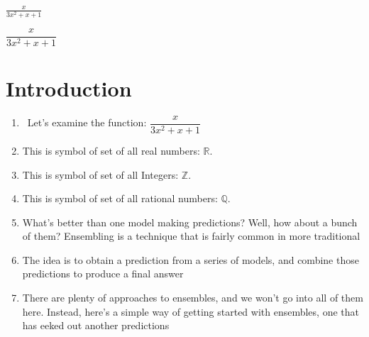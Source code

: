 \documentclass[11pt, a4paper]{article}
\def\eq1{\dfrac{x}{3x^2+x+1}}
\newcommand{\set}[1]{\setlength{\itemsep}{#1cm}}
\begin{document}
$\frac{x}{3x^2+x+1}$

$\dfrac{x}{3x^2+x+1}$ %

\section{Introduction}
\begin{enumerate}
    \set{0.3}
    \item \faCalculator\ Let's examine the function: $\eq1$  %
    \item \faPen This is symbol of set of all real numbers: $\mathbb{R}$.
    \item \faEdit This is symbol of set of all Integers: $\mathbb{Z}$.
    \item This is symbol of set of all rational numbers: $\mathbb{Q}$.
    \item  What’s	better	than	one	model	making	predictions?	Well,	how	about	a	bunch	of
 them?	Ensembling	is	a	technique	that	is	fairly	common	in	more	traditional
    \item The
 idea	is	to	obtain	a	prediction	from	a	series	of	models,	and	combine	those
 predictions	to	produce	a	final	answer
    \item  There	are	plenty	of	approaches	to	ensembles,	and	we	won’t	go	into	all	of	them
 here.	Instead,	here’s	a	simple	way	of	getting	started	with	ensembles,	one	that	has
 eeked	out	another predictions
    
\end{enumerate}
\end{document}
